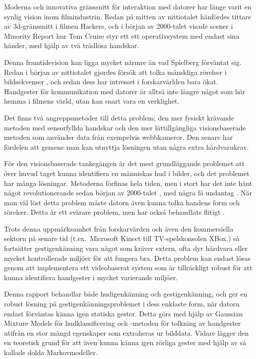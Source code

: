 \documentclass[../rapport_MVEX01-11-05]{subfiles}
\begin{document}
Moderna och innovativa gränssnitt för interaktion med datorer har länge varit
en synlig vision inom filmindustrin. Redan på mitten av nittiotalet hänfördes
tittare av 3d-gränssnitt i filmen Hackers, och i början av 2000-talet visade
scener i Minority Report hur Tom Cruise styr ett ett operativsystem med endast
sina händer, med hjälp av två trådlösa handskar.

Denna framtidsvision kan
ligga mycket närmre än vad Spielberg förväntat sig. Redan i början av
nittiotalet gjordes försök att tolka mänskliga rörelser i bildsekvenser
\cite{Yamato92}, och sedan dess har intresset i forskarvärlden bara ökat.
Handgester för kommunikation med datorer är alltså inte längre något som
hör hemma i filmens värld, utan kan snart vara en verklighet.

Det finns två angreppsmetoder till detta problem; den mer fysiskt krävande
metoden med sensorfyllda handskar och den mer lättillgängliga visionsbaserade
metoden som använder data från exempelvis webbkameror. Den senare har
fördelen att gemene man kan utnyttja lösningen utan några extra hårdvarukrav.

För den visionsbaserade tankegången är det mest grundläggande problemet att över huvud taget kunna identifiera en människas hud i bilder, och det
problemet har många lösningar. Metoderna förfinas hela tiden, men i stort har
det inte hänt något revolutionerande sedan början av 2000-talet
\cite{Sebe04,Kruppa02,Albiol01,Brand00}, med några få undantag
. När man väl löst detta problem måste datorn
även kunna tolka handens form och rörelser. Detta är ett svårare problem, men
har också behandlats flitigt \cite{Pavlovic97,Garg09,Nielsen04,Zabulis09}.

Trots denna uppmärksamhet från forskarvärden och även den kommersiella sektorn
på senare tid (t.ex.~Microsoft Kinect till TV-spelskonsolen XBox.) så fortsätter gestigenkänning vara något som
kräver extern, ofta dyr hårdvara eller mycket kontrollerade miljöer för att
fungera bra. Detta problem kan endast lösas genom att implementera ett
videobaserat system som är tillräckligt robust för att kunna identifiera
handgester i mycket varierande miljöer.

Denna rapport behandlar både hudigenkänning och gestigenkänning, och ger en
robust lösning på gestigenkänningsproblemet i dess enklaste form, när
datorn endast förväntas känna igen statiska gester. Detta görs med hjälp av
Gaussian Mixture Models för hudklassificering och \knn-metoden för tolkning
av handgester utifrån en stor mängd egenskaper som extraheras ur bilddata.
Vidare lägger den en
teoretisk grund för att även kunna känna igen rörliga gester med hjälp av
så kallade dolda Markovmodeller.
\end{document}
